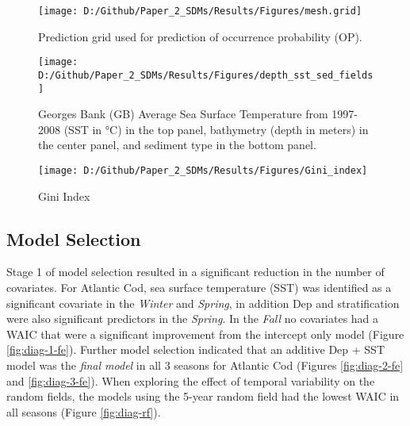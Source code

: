 \documentclass[
]{article}
\begin{document}
\clearpage
\begin{figure}
\texttt{[image: D:/Github/Paper\_2\_SDMs/Results/Figures/mesh.grid]} \caption{Prediction grid used for prediction of occurrence probability (OP).}\label{fig:mesh-grid}
\end{figure}

\clearpage
\begin{figure}
\texttt{[image: D:/Github/Paper\_2\_SDMs/Results/Figures/depth\_sst\_sed\_fields]} \caption{Georges Bank (GB) Average Sea Surface Temperature from 1997-2008 (SST in °C) in the top panel, bathymetry (depth in meters) in the center panel, and sediment type in the bottom panel.}\label{fig:SST-Dep-Sed}
\end{figure}

\begin{landscape} 
\begin{figure}
\texttt{[image: D:/Github/Paper\_2\_SDMs/Results/Figures/Gini\_index]} \caption{Gini Index }\label{fig:gini-index}
\end{figure}
\end{landscape}

\hypertarget{model-selection}{%
\subsection{Model Selection}\label{model-selection}}

Stage 1 of model selection resulted in a significant reduction in the number of covariates. For Atlantic Cod, sea surface temperature (SST) was identified as a significant covariate in the \emph{Winter} and \emph{Spring}, in addition Dep and stratification were also significant predictors in the \emph{Spring}. In the \emph{Fall} no covariates had a WAIC that were a significant improvement from the intercept only model (Figure \ref{fig:diag-1-fe}). Further model selection indicated that an additive Dep + SST model was the \emph{final model} in all 3 seasons for Atlantic Cod (Figures \ref{fig:diag-2-fe} and \ref{fig:diag-3-fe}). When exploring the effect of temporal variability on the random fields, the models using the 5-year random field had the lowest WAIC in all seasons (Figure \ref{fig:diag-rf}).
\end{document}
